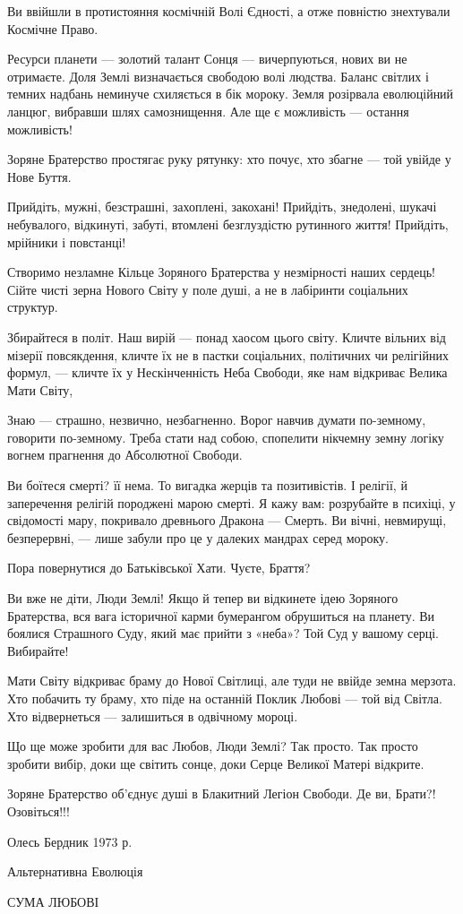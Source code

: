 Ви ввійшли в протистояння космічній Волі Єдності, а отже повністю знехтували
Космічне Право.

Ресурси планети — золотий талант Сонця — вичерпуються, нових ви не отримаєте.
Доля Землі визначається свободою волі людства. Баланс світлих і темних надбань
неминуче схиляється в бік мороку. Земля розірвала еволюційний ланцюг, вибравши
шлях самознищення. Але ще є можливість — остання можливість!

Зоряне Братерство простягає руку рятунку: хто почує, хто збагне — той увійде у
Нове Буття.

Прийдіть, мужні, безстрашні, захоплені, закохані! Прийдіть, знедолені, шукачі
небувалого, відкинуті, забуті, втомлені безглуздістю рутинного життя! Прийдіть,
мрійники і повстанці!

Створимо незламне Кільце Зоряного Братерства у незмірності наших сердець! Сійте
чисті зерна Нового Світу у поле душі, а не в лабіринти соціальних структур.

Збирайтеся в політ. Наш вирій — понад хаосом цього світу. Кличте вільних від
мізерії повсякдення, кличте їх не в пастки соціальних, політичних чи релігійних
формул, — кличте їх у Нескінченність Неба Свободи, яке нам відкриває Велика
Мати Світу,

Знаю — страшно, незвично, незбагненно. Ворог навчив думати по-земному, говорити
по-земному. Треба стати над собою, спопелити нікчемну земну логіку вогнем
прагнення до Абсолютної Свободи.

Ви боїтеся смерті? її нема. То вигадка жерців та позитивістів. І релігії, й
заперечення релігій породжені марою смерті. Я кажу вам: розрубайте в психіці, у
свідомості мару, покривало древнього Дракона — Смерть. Ви вічні, невмирущі,
безперервні, — лише забули про це у далеких мандрах серед мороку.

Пора повернутися до Батьківської Хати. Чуєте, Браття?

Ви вже не діти, Люди Землі! Якщо й тепер ви відкинете ідею Зоряного Братерства,
вся вага історичної карми бумерангом обрушиться на планету. Ви боялися
Страшного Суду, який має прийти з «неба»? Той Суд у вашому серці. Вибирайте!

Мати Світу відкриває браму до Нової Світлиці, але туди не ввійде земна мерзота.
Хто побачить ту браму, хто піде на останній Поклик Любові — той від Світла. Хто
відвернеться — залишиться в одвічному мороці.

Що ще може зробити для вас Любов, Люди Землі? Так просто. Так просто зробити
вибір, доки ще світить сонце, доки Серце Великої Матері відкрите.

Зоряне Братерство об’єднує душі в Блакитний Легіон Свободи. Де ви, Брати?!
Озовіться!!!

Олесь Бердник 1973 р.

Альтернативна Еволюція

СУМА ЛЮБОВІ
